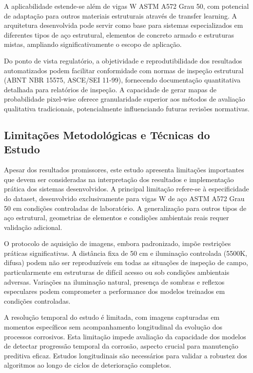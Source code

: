 \documentclass[12pt,a4paper,twoside]{article}
\begin{document}
A aplicabilidade estende-se além de vigas W ASTM A572 Grau 50, com potencial de adaptação para outros materiais estruturais através de transfer learning. A arquitetura desenvolvida pode servir como base para sistemas especializados em diferentes tipos de aço estrutural, elementos de concreto armado e estruturas mistas, ampliando significativamente o escopo de aplicação.

Do ponto de vista regulatório, a objetividade e reprodutibilidade dos resultados automatizados podem facilitar conformidade com normas de inspeção estrutural (ABNT NBR 15575, ASCE/SEI 11-99), fornecendo documentação quantitativa detalhada para relatórios de inspeção. A capacidade de gerar mapas de probabilidade pixel-wise oferece granularidade superior aos métodos de avaliação qualitativa tradicionais, potencialmente influenciando futuras revisões normativas.

\subsection{Limitações Metodológicas e Técnicas do Estudo}
\label{subsec:limitacoes}

Apesar dos resultados promissores, este estudo apresenta limitações importantes que devem ser consideradas na interpretação dos resultados e implementação prática dos sistemas desenvolvidos. A principal limitação refere-se à especificidade do dataset, desenvolvido exclusivamente para vigas W de aço ASTM A572 Grau 50 em condições controladas de laboratório. A generalização para outros tipos de aço estrutural, geometrias de elementos e condições ambientais reais requer validação adicional.

O protocolo de aquisição de imagens, embora padronizado, impõe restrições práticas significativas. A distância fixa de 50 cm e iluminação controlada (5500K, difusa) podem não ser reproduzíveis em todas as situações de inspeção de campo, particularmente em estruturas de difícil acesso ou sob condições ambientais adversas. Variações na iluminação natural, presença de sombras e reflexos especulares podem comprometer a performance dos modelos treinados em condições controladas.

A resolução temporal do estudo é limitada, com imagens capturadas em momentos específicos sem acompanhamento longitudinal da evolução dos processos corrosivos. Esta limitação impede avaliação da capacidade dos modelos de detectar progressão temporal da corrosão, aspecto crucial para manutenção preditiva eficaz. Estudos longitudinais são necessários para validar a robustez dos algoritmos ao longo de ciclos de deterioração completos.
\end{document}

